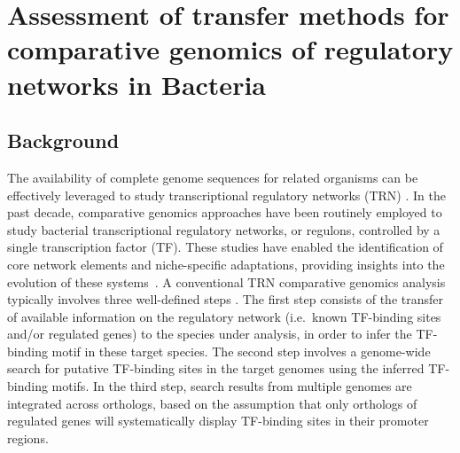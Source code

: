 
\chapter{Assessment of transfer methods for comparative genomics of regulatory
  networks in Bacteria}

\section{Background}

The availability of complete genome sequences for related organisms can be
effectively leveraged to study transcriptional regulatory networks (TRN)
\citep{babu2008computational}. In the past decade, comparative genomics
approaches have been routinely employed to study bacterial transcriptional
regulatory networks, or regulons, controlled by a single transcription factor
(TF). These studies have enabled the identification of core network elements
and niche-specific adaptations, providing insights into the evolution of these
systems~\citep{tan2001comparative, makarova2001conservation,
  erill2004differences, venancio2009reconstructing, baumbach2010power,
  rodionov2013transcriptional}. A conventional TRN comparative genomics
analysis typically involves three well-defined steps
\citep{babu2008computational, gelfand2000comparative, baumbach2009reliable}. The
first step consists of the transfer of available information on the regulatory
network (i.e.\ known TF-binding sites and/or regulated genes) to the species
under analysis, in order to infer the TF-binding motif in these target
species. The second step involves a genome-wide search for putative TF-binding
sites in the target genomes using the inferred TF-binding motifs. In the third
step, search results from multiple genomes are integrated across orthologs,
based on the assumption that only orthologs of regulated genes will
systematically display TF-binding sites in their promoter regions.

